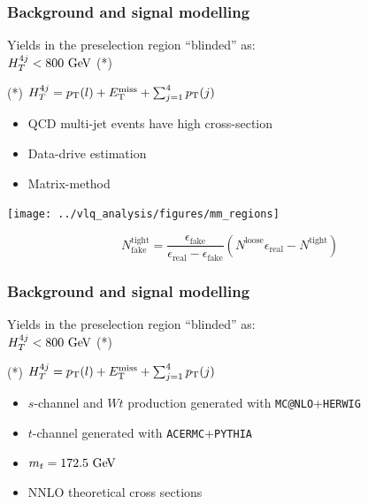 \begin{frame}\frametitle{Background and signal modelling}
\centering\myskip

\begin{minipage}{.5\textwidth}\centering
\scriptsize
Yields in the preselection region ``blinded'' as:\\
$\htfj<800\gev$ (*)
\myskip

  

\myskip
(*) $\htfj = \pT(l) + \met + \sum_{j = 1}^{\rm 4}\pT(j)$
\end{minipage}\begin{minipage}{.5\textwidth}\footnotesize\centering

\begin{itemize}
\item QCD multi-jet events have high cross-section
\item Data-drive estimation
\item Matrix-method       
\end{itemize}

\texttt{[image: ../vlq\_analysis/figures/mm\_regions]}

$$N^\mathrm{tight}_\mathrm{fake} = \frac{\epsilon_\mathrm{fake}}{\epsilon_\mathrm{real} - \epsilon_\mathrm{fake}}(N^\mathrm{loose} \epsilon_\mathrm{real} - N^\mathrm{tight})$$

\end{minipage}
\end{frame}


\begin{frame}\frametitle{Background and signal modelling}
\centering\myskip

\begin{minipage}{.5\textwidth}\footnotesize\centering
\scriptsize
Yields in the preselection region ``blinded'' as:\\
$\htfj<800\gev$ (*)
\myskip

  

\myskip
(*) $\htfj = \pT(l) + \met + \sum_{j = 1}^{\rm 4}\pT(j)$
\end{minipage}\begin{minipage}{.5\textwidth}\footnotesize\centering

\begin{itemize}
\item $s$-channel and $Wt$ production generated with {\tt MC@NLO}+{\tt HERWIG}
\item $t$-channel generated with {\tt ACERMC}+{\tt PYTHIA}
\item $m_t = 172.5\gev$
\item NNLO theoretical cross sections
\end{itemize}

\end{minipage}
\end{frame}


